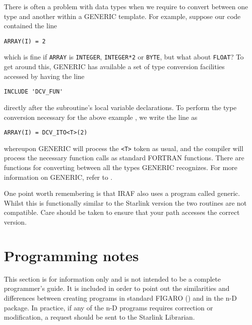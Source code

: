 There is often a problem with data types when we require to convert between
one type and another within a GENERIC template. For example, suppose our
code contained the line


\begin{myquote}
\begin{verbatim}
ARRAY(I) = 2
\end{verbatim}
\end{myquote}

which is fine if {\tt ARRAY} is {\tt INTEGER}, {\tt INTEGER*2} or {\tt BYTE},
but what about {\tt FLOAT}? To get around this, GENERIC has available a set
of type conversion facilities accessed by having the line

\begin{myquote}
\begin{verbatim}
INCLUDE 'DCV_FUN'
\end{verbatim}
\end{myquote}

directly after the subroutine's local variable declarations. To perform the
type conversion necessary for the above example , we write the line as

\begin{myquote}
\begin{verbatim}
ARRAY(I) = DCV_ITO<T>(2)
\end{verbatim}
\end{myquote}

whereupon GENERIC will process the {\tt <T>} token as usual, and the compiler
will process the necessary function calls as standard FORTRAN functions. There
are functions for converting between all the types GENERIC recognizes. For
more information on GENERIC, refer to
.

One point worth remembering is that IRAF also uses a program called generic.
Whilst this is functionally similar to the Starlink version the two routines
are not compatible. Care should be taken to ensure that your path
accesses the correct version.


\section{Programming notes{}}
\label{notes}

This section is for information only and is not intended to be a complete
programmer's guide. It is included in order to point out the similarities
and differences between creating programs in standard FIGARO
() and in the
n-D package. In practice, if any of the n-D programs requires correction
or modification, a request should be sent to the Starlink Librarian.

